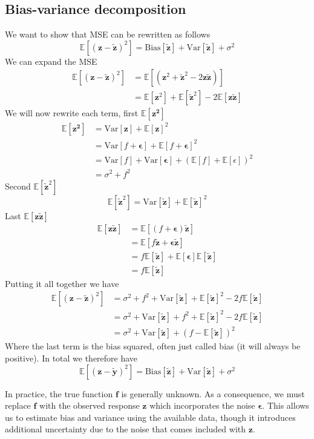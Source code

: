 \documentclass{article}
\newcommand{\EE}{\mathbb{E}}
\newcommand{\bb}[1]{\boldsymbol{#1}}
\newcommand{\ty}{\tilde{\bb{z}}}
\begin{document}
\subsection{Bias-variance decomposition}
\label{app_derivations:bias_variance_decomp}
We want to show that MSE can be rewritten as follows 
$$\EE[(\bb{z} - \tilde{\bb{z}})^{2}] = \text{Bias}[\tilde{\bb{z}}] + \text{Var}[\tilde{\bb{z}}] + \sigma^{2}$$
We can expand the MSE  
\begin{align*}
    \EE[(\bb{z} - \tilde{\bb{z}})^{2}] &= \EE[(\bb{z}^{2} + \tilde{\bb{z}}^{2} - 2\bb{z}\tilde{\bb{z}})] \\ 
    &= \EE[\bb{z}^{2}] + \EE[\ty^{2}] - 2\EE[\bb{z}\ty]
\end{align*}
We will now rewrite each term, first $\EE[\bb{z^2}]$
\begin{align*}
    \EE[\bb{z^2}] &= \text{Var}[\bb{z}] + \EE[\bb{z}]^{2} \\
    &= \text{Var}[f + \bb{\epsilon}] + \EE[f + \bb{\epsilon}]^{2} \\
    &= \text{Var}[f]+ \text{Var}[\bb{\epsilon}] + (\EE[f] + \EE[\epsilon])^{2} \\
    &= \sigma^{2}+ f^{2}
\end{align*}
Second $\EE[\ty^{2}]$
$$\EE[\ty^{2}] = \text{Var}[\ty] + \EE[\ty]^{2}$$
Last $\EE[\bb{z}\ty]$ 
\begin{align*}
    \EE[\bb{z}\ty] &= \EE[(f + \bb{\epsilon})\ty] \\
    &= \EE[f\ty + \bb{\epsilon}\ty] \\
    &= f\EE[\ty] + \EE[{\bb{\epsilon}}]\EE[\ty] \\
    &= f\EE[\ty]
\end{align*}
Putting it all together we have
\begin{align*}
    \EE[(\bb{z} - \tilde{\bb{z}})^{2}] &= \sigma^{2}+f^{2}+\text{Var}[\ty] + \EE[\ty]^{2} - 2f\EE[\ty] \\
    &= \sigma^{2} + \text{Var}[\ty] + f^{2} + \EE[\ty]^{2} - 2f\EE[\ty] \\
    &= \sigma^{2} + \text{Var}[\ty] + (f - \EE[\ty])^{2}
\end{align*}
Where the last term is the bias squared, often just called bias (it will always be positive). In total we therefore have
$$\EE[(\bb{z} - \tilde{\bb{y}})^{2}] = \text{Bias}[\tilde{\bb{z}}] + \text{Var}[\tilde{\bb{z}}] + \sigma^{2}$$

In practice, the true function $\bm{f}$ is generally unknown. As a consequence, we must replace $\bm{f}$ with the observed response $\bm{z}$ which incorporates the noise $\boldsymbol{\epsilon}$. This allows us to estimate bias and variance using the available data, though it introduces additional uncertainty due to the noise that comes included with $\bm{z}$.
\end{document}
